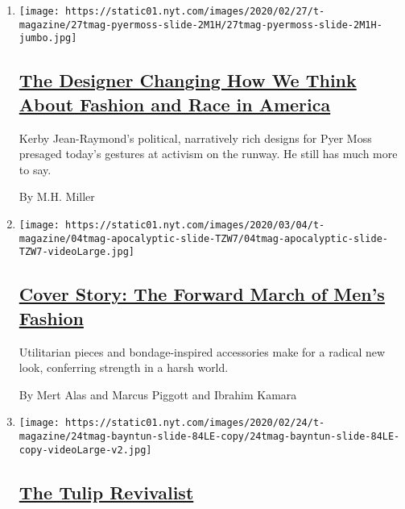 \begin{enumerate}
\def\labelenumi{\arabic{enumi}.}
\item
  \texttt{[image: https://static01.nyt.com/images/2020/02/27/t-magazine/27tmag-pyermoss-slide-2M1H/27tmag-pyermoss-slide-2M1H-jumbo.jpg]}

  \hypertarget{the-designer-changing-how-we-think-about-fashion-and-race-in-america}{%
  \subsection{\texorpdfstring{\href{/2020/03/05/t-magazine/pyer-moss-kerby-jean-raymond.html}{The
  Designer Changing How We Think About Fashion and Race in
  America}}{The Designer Changing How We Think About Fashion and Race in America}}\label{the-designer-changing-how-we-think-about-fashion-and-race-in-america}}

  Kerby Jean-Raymond's political, narratively rich designs for Pyer Moss
  presaged today's gestures at activism on the runway. He still has much
  more to say.

  By M.H. Miller
\item
  \texttt{[image: https://static01.nyt.com/images/2020/03/04/t-magazine/04tmag-apocalyptic-slide-TZW7/04tmag-apocalyptic-slide-TZW7-videoLarge.jpg]}

  \hypertarget{cover-story-the-forward-march-of-mens-fashion}{%
  \subsection{\texorpdfstring{\href{/2020/03/04/t-magazine/mens-fashion-spring-trends.html}{Cover
  Story: The Forward March of Men's
  Fashion}}{Cover Story: The Forward March of Men's Fashion}}\label{cover-story-the-forward-march-of-mens-fashion}}

  Utilitarian pieces and bondage-inspired accessories make for a radical
  new look, conferring strength in a harsh world.

  By Mert Alas and Marcus Piggott and Ibrahim Kamara
\item
  \texttt{[image: https://static01.nyt.com/images/2020/02/24/t-magazine/24tmag-bayntun-slide-84LE-copy/24tmag-bayntun-slide-84LE-copy-videoLarge-v2.jpg]}

  \hypertarget{the-tulip-revivalist}{%
  \subsection{\texorpdfstring{\href{/2020/02/24/t-magazine/polly-nicholson-bayntun-flowers.html}{The
  Tulip Revivalist}}{The Tulip Revivalist}}\label{the-tulip-revivalist}}


\end{enumerate}

